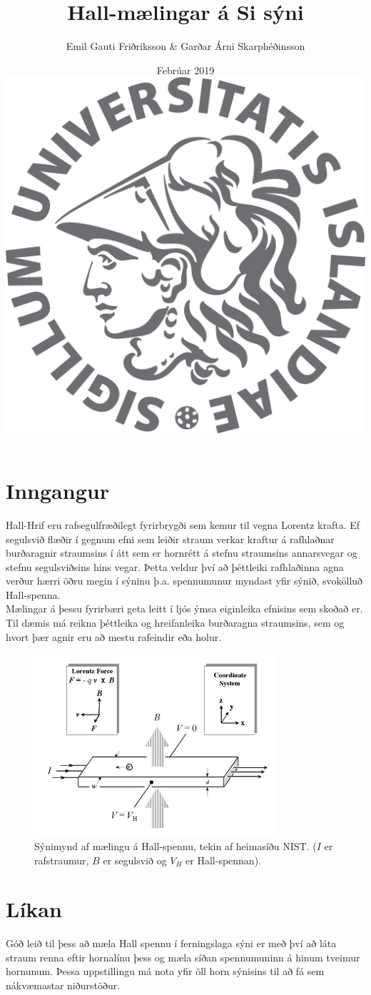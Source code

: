 \documentclass[11pt]{article}
\title{{\Huge Hall-mælingar á Si sýni}}
\author{Emil Gauti Friðriksson \& Garðar Árni Skarphéðinsson}
\date{Febrúar 2019 \\
\vspace{5cm}
\includegraphics[width = .6\textwidth]{HIlogo1.png}}
\begin{document}
\maketitle
\thispagestyle{empty}

\newpage

\section{Inngangur}
Hall-Hrif eru rafsegulfræðilegt fyrirbrygði sem kemur til vegna Lorentz krafta. Ef segulsvið flæðir í gegnum efni sem leiðir straum verkar kraftur á rafhlaðnar burðaragnir straumsins í átt sem er hornrétt á stefnu straumsins annarsvegar og stefnu segulsviðsins hins vegar. Þetta veldur því að þéttleiki rafhlaðinna agna verður hærri öðru megin í sýninu þ.a. spennumunur myndast yfir sýnið, svokölluð Hall-spenna. \\
Mælingar á þessu fyrirbæri geta leitt í ljós ýmsa eiginleika efnisins sem skoðað er. Til dæmis má reikna þéttleika og hreifanleika burðaragna straumsins, sem og hvort þær agnir eru að mestu rafeindir eða holur. 

\begin{figure}[H]
\centering
	\includegraphics[width = 90mm]{fig1.jpg}
	\caption{Sýnimynd af mælingu á Hall-spennu, tekin af heimasíðu NIST. ($I$ er rafstraumur, $B$ er segulsvið og $V_H$ er Hall-spennan).}
	\label{fig:nist1}
\end{figure}

\section{Líkan}
Góð leið til þess að mæla Hall spennu í ferningslaga sýni er með því að láta straum renna eftir hornalínu þess og mæla síðan spennumuninn á hinum tveimur hornunum. Þessa uppstillingu má nota yfir öll horn sýnisins til að fá sem nákvæmastar niðurstöður. 
\end{document}
